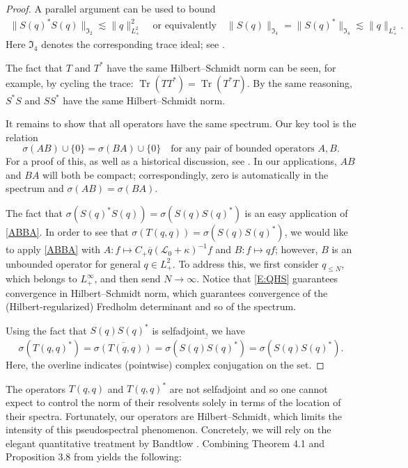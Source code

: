 \documentclass{amsart}
\numberwithin{equation}{section}
\theoremstyle{definition}
\newcommand{\Lc}{\mathcal{L}}
\newcommand{\I}{\mathfrak{I}}
\DeclareMathOperator{\Tr}{Tr}
\newcommand{\qtq}[1]{\quad\text{#1}\quad}
\newcommand{\widebar}{\overline}
\begin{document}
\begin{proof}
A parallel argument can be used to bound
\begin{align}\label{1:52}
\|S(q)^*S(q)\|_{\I _2}\lesssim \|q\|_{L^2_+}^2 \qtq{or equivalently} \|S(q)\|_{\I _4}=\|S(q)^*\|_{\I _4}\lesssim \|q\|_{L^2_+}.
\end{align}
Here $\I_4$ denotes the corresponding trace ideal; see \cite{simon_book}.

The fact that $T$ and $T^*$ have the same Hilbert--Schmidt norm can be seen, for example, by cycling the trace: $\Tr(TT^*)=\Tr(T^*T)$.  By the same reasoning, $S^*S$ and $SS^*$ have the same Hilbert--Schmidt norm.

It remains to show that all operators have the same spectrum.  Our key tool is the relation
\begin{equation}\label{ABBA}
\sigma(AB)\cup\{0\}  = \sigma(BA)\cup\{0\} \quad\text{for any pair of bounded operators $A,B$.}
\end{equation}
For a proof of this, as well as a historical discussion, see \cite{Deift}.  In our applications, $AB$ and $BA$ will both be compact; correspondingly, zero is automatically in the spectrum and $\sigma(AB) = \sigma(BA)$.

The fact that $\sigma( S(q)^*S(q) )=\sigma( S(q)S(q)^* )$ is an easy application of \eqref{ABBA}.  In order to see that $\sigma( T(q,q) ) = \sigma( S(q)S(q)^* )$, we would like to apply \eqref{ABBA} with $A:f\mapsto C_+ \widebar q (\Lc_0 + \kappa)^{-1}f$ and $B:f\mapsto qf$; however, $B$ is an unbounded operator for general $q\in L^2_+$.  To address this, we first consider $q_{\leq N}$, which belongs to $L^\infty_+$, and then send $N\to\infty$.  Notice that \eqref{E:QHS} guarantees convergence in Hilbert--Schmidt norm, which guarantees convergence of the (Hilbert-regularized) Fredholm determinant and so of the spectrum.

Using the fact that $S(q)S(q)^*$ is selfadjoint, we have
$$
\sigma( T(q,q)^* )=\overline{\sigma( T(q,q) )} = \overline{\sigma( S(q)S(q)^* )} = \sigma( S(q)S(q)^* ).
$$
Here, the overline indicates (pointwise) complex conjugation on the set.
\end{proof}

The operators $T(q,q)$ and $T(q,q)^*$ are not selfadjoint and so one cannot expect to control the norm of their resolvents solely in terms of the location of their spectra.  
Fortunately, our operators are Hilbert--Schmidt, which limits the intensity of this pseudospectral phenomenon.  Concretely, we will rely on the elegant quantitative treatment by Bandtlow \cite{Bandtlow}.  Combining Theorem 4.1 and Proposition 3.8 from \cite{Bandtlow} yields the following:
\end{document}

